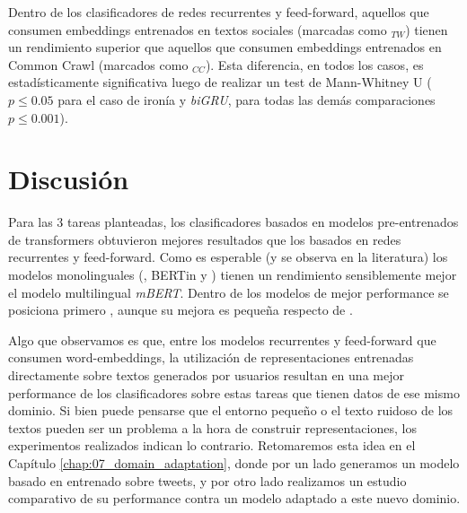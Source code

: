 Dentro de los clasificadores de redes recurrentes y feed-forward, aquellos que consumen embeddings entrenados en textos sociales (marcadas como $_{TW}$) tienen un rendimiento superior que aquellos que consumen embeddings entrenados en Common Crawl (marcados como $_{CC}$). Esta diferencia, en todos los casos, es estadísticamente significativa luego de realizar un test de Mann-Whitney U ($p \leq 0.05$ para el caso de ironía y \emph{biGRU}, para todas las demás comparaciones $p \leq 0.001$).



\section{Discusión}

Para las 3 tareas planteadas, los clasificadores basados en modelos pre-entrenados de transformers obtuvieron mejores resultados que los basados en redes recurrentes y feed-forward. Como es esperable (y se observa en la literatura) los modelos monolinguales (\roberta{}, BERTin y \beto{}) tienen un rendimiento sensiblemente mejor el modelo multilingual \emph{mBERT}. Dentro de los modelos de mejor performance se posiciona primero \roberta{}, aunque su mejora es pequeña respecto de \beto{}.

Algo que observamos es que, entre los modelos recurrentes y feed-forward que consumen word-embeddings, la utilización de representaciones entrenadas directamente sobre textos generados por usuarios resultan en una mejor performance de los clasificadores sobre estas tareas que tienen datos de ese mismo dominio. Si bien puede pensarse que el entorno pequeño o el texto ruidoso de los textos pueden ser un problema a la hora de construir representaciones, los experimentos realizados indican lo contrario. Retomaremos esta idea en el Capítulo \ref{chap:07_domain_adaptation}, donde por un lado generamos un modelo basado en \roberta{} entrenado sobre tweets, y por otro lado realizamos un estudio comparativo de su performance contra un modelo \beto{} adaptado a este nuevo dominio.


\newcommand{\pysentimiento}[0]{\textbf{pysentimiento}}
